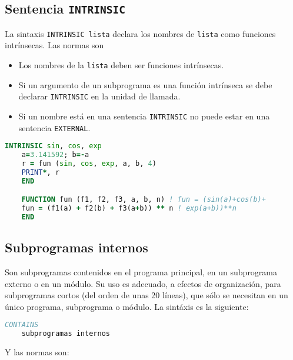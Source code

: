 \subsection{Sentencia {\tt INTRINSIC}}

La sintaxis {\tt INTRINSIC lista} declara los nombres de {\tt lista} como funciones intrínsecas. Las normas son
\begin{itemize}
	\item Los nombres de la {\tt lista} deben ser funciones intrínsecas.
	\item Si un argumento de un subprograma es una función intrínseca se debe declarar {\tt INTRINSIC} en la unidad de llamada. 
	\item Si un nombre está en una sentencia {\tt INTRINSIC} no puede estar en una sentencia {\tt EXTERNAL}.
\end{itemize}

\begin{lstlisting}[language=Fortran]
	INTRINSIC sin, cos, exp
	a=3.141592; b=-a
	r = fun (sin, cos, exp, a, b, 4)
	PRINT*, r
	END

	FUNCTION fun (f1, f2, f3, a, b, n) ! fun = (sin(a)+cos(b)+
	fun = (f1(a) + f2(b) + f3(a+b)) ** n ! exp(a+b))**n	
	END
\end{lstlisting}

\subsection{Subprogramas internos}

Son subprogramas contenidos en el programa principal, en un subprograma externo o en un módulo. Su uso es adecuado, a efectos de organización, para subprogramas cortos (del orden de unas 20 líneas), que sólo se necesitan en un único programa, subprograma o módulo.  La sintáxis es la siguiente:

\begin{lstlisting}[language=Fortran]
	CONTAINS
	subprogramas internos
\end{lstlisting}
Y las normas son:

